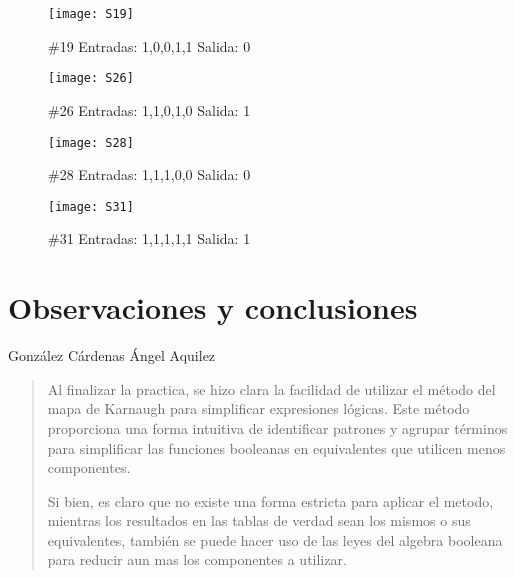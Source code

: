 \documentclass[a4paper,12pt]{article}
\begin{document}
\vspace{.5cm}

\begin{figure}[ht!]
	\centering

	\texttt{[image: S19]}

	\caption{\#19 Entradas: 1,0,0,1,1 Salida: 0}
\end{figure}

\vspace{.5cm}

\begin{figure}[ht!]
	\centering

	\texttt{[image: S26]}

	\caption{\#26 Entradas: 1,1,0,1,0 Salida: 1}
\end{figure}

\vspace{.5cm}

\begin{figure}[ht!]
	\centering

	\texttt{[image: S28]}

	\caption{\#28 Entradas: 1,1,1,0,0 Salida: 0}
\end{figure}

\vspace{.5cm}

\begin{figure}[ht!]
	\centering

	\texttt{[image: S31]}

	\caption{\#31 Entradas: 1,1,1,1,1 Salida: 1}
\end{figure}

\clearpage

%
%
%
%
\newpage
\section{Observaciones y conclusiones}

González Cárdenas Ángel Aquilez

\begin{quotation}
	Al finalizar la practica, se hizo clara la facilidad de utilizar el método del mapa de Karnaugh para simplificar expresiones lógicas. Este método proporciona una forma intuitiva de identificar patrones y agrupar términos para simplificar las funciones booleanas en equivalentes que utilicen menos componentes. \par

	Si bien, es claro que no existe una forma estricta para aplicar el metodo, mientras los resultados en las tablas de verdad sean los mismos o sus equivalentes, también se puede hacer uso de las leyes del algebra booleana para reducir aun mas los componentes a utilizar.

\end{quotation}
\end{document}
